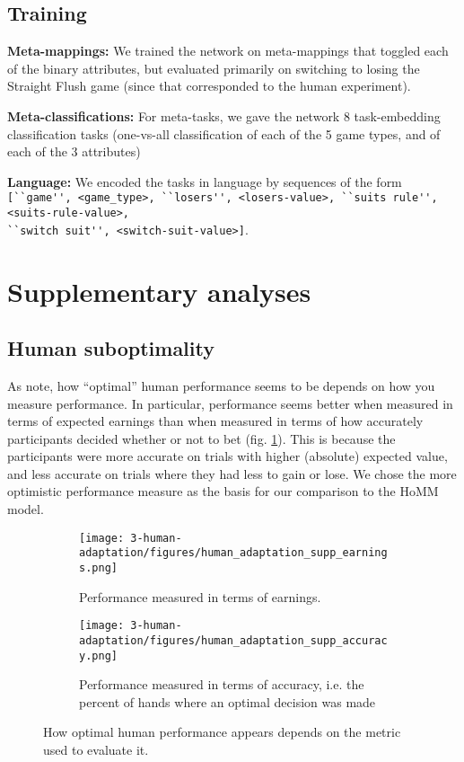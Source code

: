 \subsection{Training}
\textbf{Meta-mappings:} We trained the network on meta-mappings that toggled each of the binary attributes, but evaluated primarily on switching to losing the Straight Flush game (since that corresponded to the human experiment).\par
\textbf{Meta-classifications:} For meta-tasks, we gave the network 8 task-embedding classification tasks (one-vs-all classification of each of the 5 game types, and of each of the 3 attributes) \par
\textbf{Language:} We encoded the tasks in language by sequences of the form\\
\verb|[``game'', <game_type>, ``losers'', <losers-value>, ``suits rule'', <suits-rule-value>,|\\
\verb|``switch suit'', <switch-suit-value>]|.



\section{Supplementary analyses}
\subsection{Human suboptimality}\label{appendix:human:suboptimality}
As \citet{Jarvstad2013} note, how ``optimal'' human performance seems to be depends on how you measure performance. In particular, performance seems better when measured in terms of expected earnings than when measured in terms of how accurately participants decided whether or not to bet (fig. \ref{fig:appx_human_calibration}). This is because the participants were more accurate on trials with higher (absolute) expected value, and less accurate on trials where they had less to gain or lose. We chose the more optimistic performance measure as the basis for our comparison to the HoMM model.
\begin{figure}[H]
\centering
\begin{subfigure}[t]{0.5\textwidth}
\texttt{[image: 3-human-adaptation/figures/human\_adaptation\_supp\_earnings.png]}
\caption{Performance measured in terms of earnings.}
\end{subfigure}%
\begin{subfigure}[t]{0.5\textwidth}
\texttt{[image: 3-human-adaptation/figures/human\_adaptation\_supp\_accuracy.png]}
\caption{Performance measured in terms of accuracy, i.e. the percent of hands where an optimal decision was made}
\end{subfigure}%
\caption{How optimal human performance appears depends on the metric used to evaluate it.} \label{fig:appx_human_calibration}
\end{figure}

